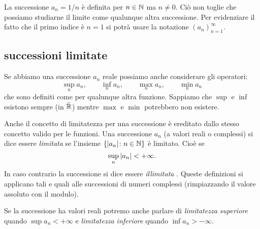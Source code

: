 \begin{example}
  La successione $a_n = 1/n$ è definita per $n\in {\mathbb N}$ ma $n\neq 0$.
  Ciò non toglie che possiamo studiarne il limite come qualunque altra
  successione. Per evidenziare il fatto che il primo indice è $n=1$
  si potrà usare la notazione $(a_n)_{n=1}^\infty$.
\end{example}
 
\subsection{successioni limitate}
\label{sec:successione_limitata}%

Se abbiamo una successione $a_n$ reale possiamo anche considerare gli operatori:
\[
  \sup_n a_n, \qquad 
  \inf_n a_n, \qquad 
  \max_n a_n, \qquad 
  \min_n a_n 
\]
che sono definiti come per qualunque altra funzione. 
Sappiamo che $\sup$ e $\inf$ esistono sempre (in $\bar{{\mathbb R}}$) mentre $\max$ e $\min$
potrebbero non esistere.

Anche il concetto di limitatezza per una successione è ereditato dallo stesso 
concetto valido per le funzioni.
Una successione $a_n$ (a valori reali o complessi) si dice essere 
\emph{limitata}%
%
 se 
l'insieme $\{{\left|a_n\right|}\colon n \in {\mathbb N}\}$ è limitato. Cioè se 
\[
\sup_n {\left|a_n\right|} < +\infty.  
\]
In caso contrario la successione si dice essere \emph{illimitata}%
%
.
Queste definizioni si applicano tali e quali alle successioni di numeri 
complessi (rimpiazzando il valore assoluto con il modulo).

Se la successione ha valori reali potremo anche parlare di 
\emph{limitatezza superiore} quando $\sup a_n <+\infty$ 
e \emph{limitatezza inferiore} quando $\inf a_n > -\infty$.


